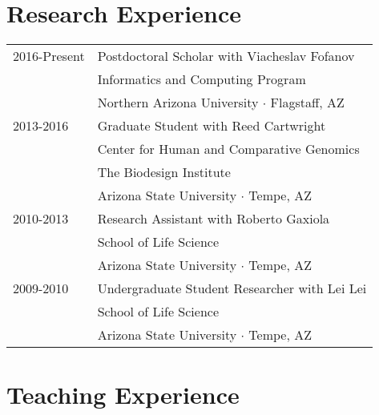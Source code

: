 \documentclass[11pt]{article}
\begin{document}
\section*{Research Experience}
\begin{tabularx}{\linewidth}{lX}
2016-Present& Postdoctoral Scholar with Viacheslav Fofanov\\
&Informatics and Computing Program\\ \vspace{2mm}
&Northern Arizona University $\cdotp$ Flagstaff, AZ\\
2013-2016&Graduate Student with Reed Cartwright\\
&Center for Human and Comparative Genomics\\
&The Biodesign Institute\\ \vspace{2mm}
&Arizona State University $\cdotp$ Tempe, AZ\\ 
2010-2013&Research Assistant with Roberto Gaxiola\\
&School of Life Science\\ \vspace{2mm}
&Arizona State University $\cdotp$ Tempe, AZ\\ 
2009-2010&Undergraduate Student Researcher with Lei Lei\\
&School of Life Science\\
&Arizona State University $\cdotp$ Tempe, AZ\\
\end{tabularx}



\section*{Teaching Experience}
\end{document}

